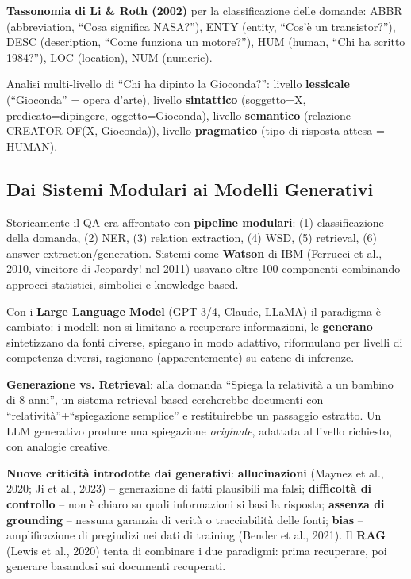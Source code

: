 \documentclass[12pt,a4paper]{article}
\begin{document}
\textbf{Tassonomia di Li \& Roth (2002)} per la classificazione delle domande: ABBR (abbreviation, ``Cosa significa NASA?''), ENTY (entity, ``Cos'\`e un transistor?''), DESC (description, ``Come funziona un motore?''), HUM (human, ``Chi ha scritto 1984?''), LOC (location), NUM (numeric).

\begin{examplebox}
Analisi multi-livello di ``Chi ha dipinto la Gioconda?'': livello \textbf{lessicale} (``Gioconda'' = opera d'arte), livello \textbf{sintattico} (soggetto=X, predicato=dipingere, oggetto=Gioconda), livello \textbf{semantico} (relazione CREATOR-OF(X, Gioconda)), livello \textbf{pragmatico} (tipo di risposta attesa = HUMAN).
\end{examplebox}

\subsection{Dai Sistemi Modulari ai Modelli Generativi}

Storicamente il QA era affrontato con \textbf{pipeline modulari}: (1) classificazione della domanda, (2) NER, (3) relation extraction, (4) WSD, (5) retrieval, (6) answer extraction/generation. Sistemi come \textbf{Watson} di IBM (Ferrucci et al., 2010, vincitore di Jeopardy! nel 2011) usavano oltre 100 componenti combinando approcci statistici, simbolici e knowledge-based.

Con i \textbf{Large Language Model} (GPT-3/4, Claude, LLaMA) il paradigma \`e cambiato: i modelli non si limitano a recuperare informazioni, le \textbf{generano} -- sintetizzano da fonti diverse, spiegano in modo adattivo, riformulano per livelli di competenza diversi, ragionano (apparentemente) su catene di inferenze.

\begin{quizbox}
\textbf{Generazione vs. Retrieval}: alla domanda ``Spiega la relativit\`a a un bambino di 8 anni'', un sistema retrieval-based cercherebbe documenti con ``relativit\`a''+``spiegazione semplice'' e restituirebbe un passaggio estratto. Un LLM generativo produce una spiegazione \emph{originale}, adattata al livello richiesto, con analogie creative.
\end{quizbox}

\textbf{Nuove criticit\`a introdotte dai generativi}: \textbf{allucinazioni} (Maynez et al., 2020; Ji et al., 2023) -- generazione di fatti plausibili ma falsi; \textbf{difficolt\`a di controllo} -- non \`e chiaro su quali informazioni si basi la risposta; \textbf{assenza di grounding} -- nessuna garanzia di verit\`a o tracciabilit\`a delle fonti; \textbf{bias} -- amplificazione di pregiudizi nei dati di training (Bender et al., 2021). Il \textbf{RAG} (Lewis et al., 2020) tenta di combinare i due paradigmi: prima recuperare, poi generare basandosi sui documenti recuperati.
\end{document}
